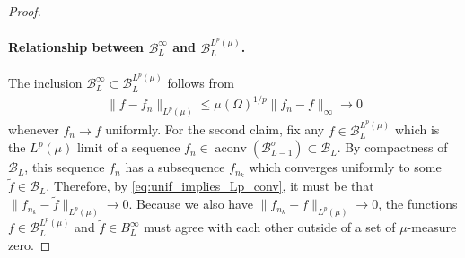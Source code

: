 \documentclass{article}
\DeclareMathOperator{\aconv}{\mathrm{aconv}}
\def\cB{{\mathcal{B}}}
\begin{document}
\begin{appendices}
\begin{proof}
\paragraph{Relationship between $\cB_L^\infty$ and $\cB_L^{L^p(\mu)}$.} The inclusion $\cB_L^\infty \subset \cB_L^{L^p(\mu)}$ follows from
\begin{align} \label{eq:unif_implies_Lp_conv}
    \| f - f_n \|_{L^p(\mu)} \leq \mu(\Omega)^{1/p} \| f_n - f \|_\infty \to 0
\end{align}
whenever $f_n \to f$ uniformly. For the second claim, fix any $f \in \cB_L^{L^p(\mu)}$ which is the $L^p(\mu)$ limit of a sequence $f_n \in \aconv(\cB_{L-1}^\sigma) \subset \cB_L$. By compactness of $\cB_L$, this sequence $f_n$ has a subsequence $f_{n_k}$ which converges uniformly to some $\tilde{f} \in \cB_L$. Therefore, by \eqref{eq:unif_implies_Lp_conv}, it must be that $\| f_{n_k} - \tilde{f} \|_{L^p(\mu)} \to 0$. Because we also have $\| f_{n_k} - f \|_{L^p(\mu)} \to 0$, the functions $f \in \cB_L^{L^p(\mu)}$ and $\tilde{f} \in B_L^\infty$ must agree with each other outside of a set of $\mu$-measure zero.
\end{proof}





\end{appendices}
\end{document}
